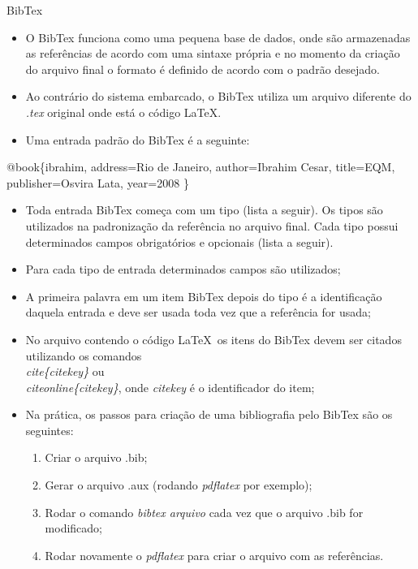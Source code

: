 \documentclass{beamer}
\begin{document}
\begin{frame}{BibTex}

  \begin{itemize}
    \item O BibTex funciona como uma pequena base de dados, onde são armazenadas as referências de acordo com uma sintaxe própria e no momento da criação do arquivo final o formato é definido de acordo com o padrão desejado. 
    \item Ao contrário do sistema embarcado, o BibTex utiliza um arquivo diferente do \textit{.tex} original onde está o código \LaTeX.
    \item Uma entrada padrão do BibTex é a seguinte:
  \end{itemize}

  \begin{block}{}
    \begin{semiverbatim}
     @book\{ibrahim,
      address={Rio de Janeiro},
      author={Ibrahim Cesar},
      title={EQM},
      publisher={Osvira Lata},
      year={2008}
    \}
    \end{semiverbatim}
  \end{block}

  \begin{itemize}
   \item Toda entrada BibTex começa com um tipo (lista a seguir). Os tipos são utilizados na padronização da referência no arquivo final. Cada tipo possui determinados campos obrigatórios e opcionais (lista a seguir). 
    \item Para cada tipo de entrada determinados campos são utilizados;
    \item A primeira palavra em um item BibTex depois do tipo é a identificação daquela entrada e deve ser usada toda vez que a referência for usada;
    \item No arquivo contendo o código \LaTeX\ os itens do BibTex devem ser citados utilizando os comandos \textit{\\cite\{citekey\}} ou \textit{\\citeonline\{citekey\}}, onde \textit{citekey} é o identificador do item;
    \item Na prática, os passos para criação de uma bibliografia pelo BibTex são os seguintes:
    \begin{enumerate}
      \item Criar o arquivo .bib;
      \item Gerar o arquivo .aux (rodando \textit{pdflatex} por exemplo);
      \item Rodar o comando \textit{bibtex arquivo} cada vez que o arquivo .bib for modificado;
      \item Rodar novamente o \textit{pdflatex} para criar o arquivo com as referências.
    \end{enumerate}


\end{itemize}
\end{frame}
\end{document}
